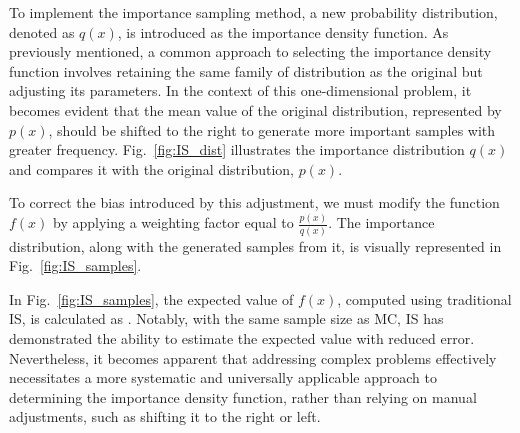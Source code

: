     


    To implement the importance sampling method, a new probability distribution, denoted as $q(x)$, is introduced as the importance density function. As previously mentioned, a common approach to selecting the importance density function involves retaining the same family of distribution as the original but adjusting its parameters. In the context of this one-dimensional problem, it becomes evident that the mean value of the original distribution, represented by $p(x)$, should be shifted to the right to generate more important samples with greater frequency. Fig.~\ref{fig:IS_dist} illustrates the importance distribution $q(x)$ and compares it with the original distribution, $p(x)$. 
    
    
    
    To correct the bias introduced by this adjustment, we must modify the function $f(x)$ by applying a weighting factor equal to $\frac{p(x)}{q(x)}$. The importance distribution, along with the \SampleSize{} generated samples from it, is visually represented in Fig.~\ref{fig:IS_samples}.
    
    

    In Fig.~\ref{fig:IS_samples}, the expected value of $f(x)$, computed using traditional IS, is calculated as \TraditionalISResult{}. Notably, with the same sample size as MC, IS has demonstrated the ability to estimate the expected value with reduced error. Nevertheless, it becomes apparent that addressing complex problems effectively necessitates a more systematic and universally applicable approach to determining the importance density function, rather than relying on manual adjustments, such as shifting it to the right or left.

